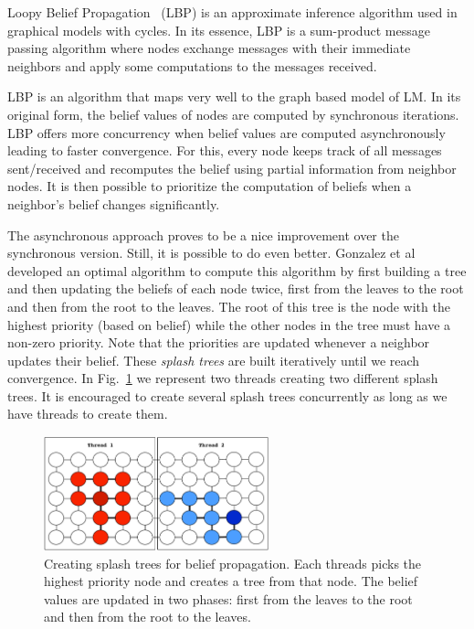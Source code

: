 
Loopy Belief Propagation~\cite{Murphy99loopybelief} (LBP) is an approximate inference algorithm
used in graphical models with cycles. In its essence, LBP is a sum-product message passing algorithm
where nodes exchange messages with their immediate neighbors and apply some computations to the messages
received.

LBP is an algorithm that maps very well to the graph based model of LM. In its
original form, the belief values of nodes are computed by synchronous iterations.
LBP offers more concurrency when belief values are computed asynchronously
leading to faster convergence. For this, every node keeps track of all messages
sent/received and recomputes the belief using partial information from neighbor
nodes. It is then possible to prioritize the computation of beliefs when a
neighbor's belief changes significantly.

The asynchronous approach proves to be a nice improvement over the synchronous
version. Still, it is possible to do even better. Gonzalez et
al~\cite{Gonzalez+al:aistats09paraml} developed an optimal algorithm to compute
this algorithm by first building a tree and then updating the beliefs of each
node twice, first from the leaves to the root and then from the root to the
leaves. The root of this tree is the node with the highest priority (based on
belief) while the other nodes in the tree must have a non-zero priority.
Note that the priorities are updated whenever a neighbor updates their belief.
These \emph{splash trees} are built iteratively until we reach convergence.
In Fig.~\ref{splash_bp} we represent two threads creating two different splash
trees. It is encouraged to create several splash trees concurrently as long as
we have threads to create them.

\begin{figure}[h!]
   \begin{center}
      \includegraphics[width=6.5cm]{figures/splash_bp}
   \end{center}
   \caption{Creating splash trees for belief propagation. Each threads picks the
   highest priority node and creates a tree from that node. The belief values
   are updated in two phases: first from the leaves to the root and then from
   the root to the leaves.}
   \label{splash_bp}
\end{figure}


